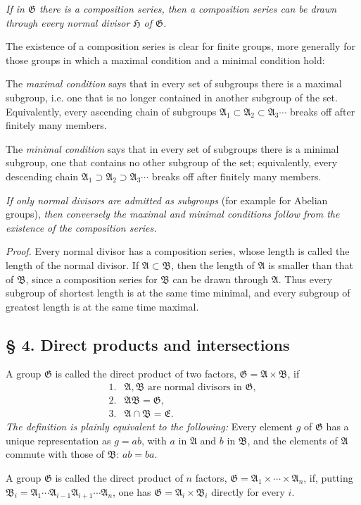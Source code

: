 \documentclass[11pt]{article}
\providecommand{\mG}{\mathfrak{G}}
\providecommand{\mA}{\mathfrak{A}}
\providecommand{\mB}{\mathfrak{B}}
\providecommand{\mE}{\mathfrak{E}}
\providecommand{\mH}{\mathfrak{H}}
\begin{document}
\emph{If in $\mG$ there is a composition series, then a composition series can be drawn through every normal divisor $\mH$ of $\mG$.}

The existence of a composition series is clear for finite groups, more generally for those groups in which a maximal condition and a minimal condition hold:

The \emph{maximal condition} says that in every set of subgroups there is a maximal subgroup, i.e. one that is no longer contained in another subgroup of the set. Equivalently, every ascending chain of subgroups $\mA_1\subset\mA_2\subset\mA_3\cdots$ breaks off after finitely many members.

The \emph{minimal condition} says that in every set of subgroups there is a minimal subgroup, one that contains no other subgroup of the set; equivalently, every descending chain $\mA_1\supset\mA_2\supset\mA_3\cdots$ breaks off after finitely many members.

\emph{If only normal divisors are admitted as subgroups} (for example for Abelian groups), \emph{then conversely the maximal and minimal conditions follow from the existence of the composition series.}

\emph{Proof.} Every normal divisor has a composition series, whose length is called the length of the normal divisor. If $\mA\subset\mB$, then the length of $\mA$ is smaller than that of $\mB$, since a composition series for $\mB$ can be drawn through $\mA$. Thus every subgroup of shortest length is at the same time minimal, and every subgroup of greatest length is at the same time maximal.

\subsection*{§ 4. Direct products and intersections}

A group $\mG$ is called the direct product of two factors, $\mG=\mA\times\mB$, if
\[
\begin{array}{ll}
1.& \mA,\mB\text{ are normal divisors in }\mG,\\
2.& \mA\mB=\mG,\\
3.& \mA\cap\mB=\mE.
\end{array}
\]
\emph{The definition is plainly equivalent to the following:} Every element $g$ of $\mG$ has a unique representation as $g=ab$, with $a$ in $\mA$ and $b$ in $\mB$, and the elements of $\mA$ commute with those of $\mB$: $ab=ba$.

A group $\mG$ is called the direct product of $n$ factors, $\mG=\mA_1\times\cdots\times\mA_n$, if, putting $\mB_i=\mA_1\cdots\mA_{i-1}\mA_{i+1}\cdots\mA_n$, one has $\mG=\mA_i\times\mB_i$ directly for every $i$.
\end{document}
